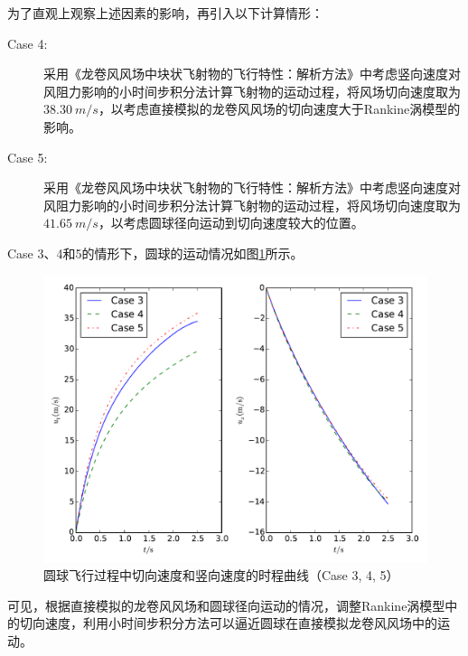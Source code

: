 \documentclass{ctexart}
\begin{document}
为了直观上观察上述因素的影响，再引入以下计算情形：
\begin{description}
\item[Case 4: ] 采用《龙卷风风场中块状飞射物的飞行特性：解析方法》中考虑竖向速度对风阻力影响的小时间步积分法计算飞射物的运动过程，将风场切向速度取为$\SI{38.30}{m/s}$，以考虑直接模拟的龙卷风风场的切向速度大于Rankine涡模型的影响。
\item[Case 5: ] 采用《龙卷风风场中块状飞射物的飞行特性：解析方法》中考虑竖向速度对风阻力影响的小时间步积分法计算飞射物的运动过程，将风场切向速度取为$\SI{41.65}{m/s}$，以考虑圆球径向运动到切向速度较大的位置。
\end{description}
Case 3、4和5的情形下，圆球的运动情况如图\ref{fig:velocity_history2}所示。
\begin{figure}
\centering
\includegraphics[width=0.8\linewidth]{./calculation/velocity_history2}
\caption{圆球飞行过程中切向速度和竖向速度的时程曲线（Case 3, 4, 5）}
\label{fig:velocity_history2}
\end{figure}
可见，根据直接模拟的龙卷风风场和圆球径向运动的情况，调整Rankine涡模型中的切向速度，利用小时间步积分方法可以逼近圆球在直接模拟龙卷风风场中的运动。
\newpage
\printbibliography
\end{document}

